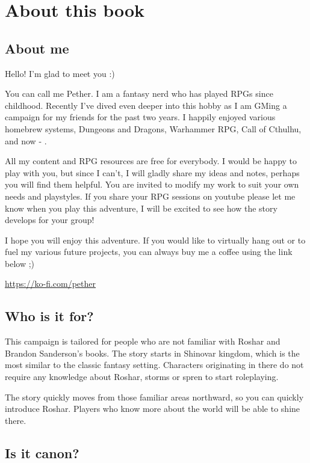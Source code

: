 \section{About this book}

\subsection{About me}

Hello! I'm glad to meet you :)

You can call me Pether. I am a fantasy nerd who has played RPGs since childhood. Recently I've dived even deeper into this hobby as I am GMing a campaign for my friends for the past two years. I happily enjoyed various homebrew systems, Dungeons and Dragons, Warhammer RPG, Call of Cthulhu, and now - \cosmereRPG{}.

All my content and RPG resources are free for everybody. I would be happy to play with you, but since I can't, I will gladly share my ideas and notes, perhaps you will find them helpful. You are invited to modify my work to suit your own needs and playstyles. If you share your RPG sessions on youtube please let me know when you play this adventure, I will be excited to see how the story develops for your group!

I hope you will enjoy this adventure. If you would like to virtually hang out or to fuel my various future projects, you can always buy me a coffee using the link below ;)

\url{https://ko-fi.com/pether}


\subsection{Who is it for?}

This campaign is tailored for people who are not familiar with Roshar and Brandon Sanderson’s books. The story starts in Shinovar kingdom, which is the most similar to the classic fantasy setting. Characters originating in there do not require any knowledge about Roshar, storms or spren to start roleplaying.

The story quickly moves from those familiar areas northward, so you can quickly introduce Roshar. Players who know more about the world will be able to shine there.

\subsection{Is it canon?}

